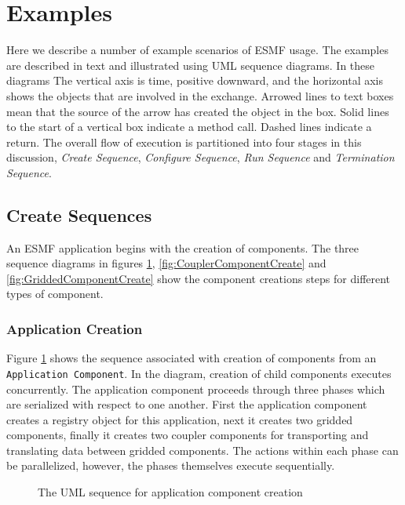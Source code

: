 \section{Examples}

Here we describe a number of example scenarios of ESMF usage. The examples are
described in text and illustrated using UML sequence diagrams. In these diagrams
The vertical axis is time, positive
downward, and the horizontal axis shows the objects that are involved in the
exchange.  Arrowed lines to text boxes mean that the source of the arrow has
created the object in the box.  Solid lines to the start of a vertical
box indicate a method call.  Dashed lines indicate a return.
The overall flow of execution is partitioned into four stages in this
discussion, {\it Create Sequence}, {\it Configure Sequence}, {\it Run Sequence}
and {\it Termination Sequence}.
 
\subsection{Create Sequences}

An ESMF application begins with the creation of components. The
three sequence diagrams in figures \ref{fig:ApplicationComponentCreate}, 
\ref{fig:CouplerComponentCreate} and 
\ref{fig:GriddedComponentCreate} show the
component creations steps for different types of component.


\subsubsection{Application Creation}
Figure \ref{fig:ApplicationComponentCreate} shows the sequence associated with
creation of components from an {\tt Application Component}. In the diagram,
creation of child components executes concurrently. The application component
proceeds through three phases which are serialized with respect to one another.
First the application component creates a registry object for this application,
next it creates two gridded components, finally it creates two coupler
components for transporting and translating data between gridded components.
The actions within each phase can be parallelized, however, the phases
themselves execute sequentially.
\begin{figure}
\caption[{Application Component Create}]
{The UML sequence for application component creation}
\label{fig:ApplicationComponentCreate}
\end{figure}


